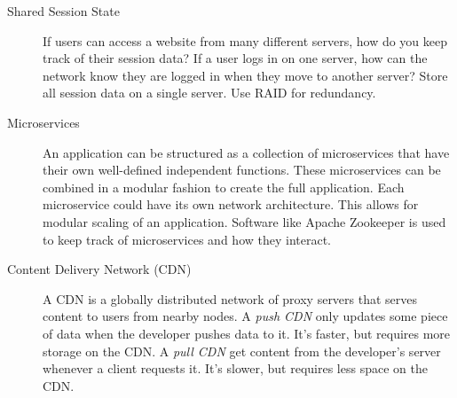 \begin{description}
    \item[Shared Session State] If users can access a website from many different servers, how do you keep track of their session data? If a user logs in on one server, how can the network know they are logged in when they move to another server? Store all session data on a single server. Use RAID for redundancy.
	
    \item[Microservices] An application can be structured as a collection of microservices that have their own well-defined independent functions. These microservices can be combined in a modular fashion to create the full application. Each microservice could have its own network architecture. This allows for modular scaling of an application. Software like Apache Zookeeper is used to keep track of microservices and how they interact.
	
    \item[Content Delivery Network (CDN)] A CDN is a globally distributed network of proxy servers that serves content to users from nearby nodes. A \textit{push CDN} only updates some piece of data when the developer pushes data to it. It's faster, but requires more storage on the CDN. A \textit{pull CDN} get content from the developer's server whenever a client requests it. It's slower, but requires less space on the CDN.
\end{description}

